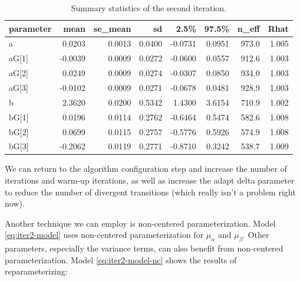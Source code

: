 \documentclass[11pt, oneside, openany]{scrbook}
\begin{document}
\begin{table}[!h]
\centering
\caption{\label{tab:ch042-Liquid-Strawberry-Eagle}Summary statistics of the second iteration.}
\centering
\begin{tabular}[t]{lrrrrrrr}
\toprule
parameter & mean & se\_mean & sd & 2.5\% & 97.5\% & n\_eff & Rhat\\
\midrule
a & 0.0203 & 0.0013 & 0.0400 & -0.0731 & 0.0951 & 973.0 & 1.005\\
aG[1] & -0.0039 & 0.0009 & 0.0272 & -0.0600 & 0.0557 & 912.6 & 1.003\\
aG[2] & 0.0249 & 0.0009 & 0.0274 & -0.0307 & 0.0850 & 934.0 & 1.003\\
aG[3] & -0.0102 & 0.0009 & 0.0271 & -0.0678 & 0.0481 & 928.9 & 1.003\\
b & 2.3620 & 0.0200 & 0.5342 & 1.4300 & 3.6154 & 710.9 & 1.002\\
\addlinespace
bG[1] & 0.0196 & 0.0114 & 0.2762 & -0.6464 & 0.5474 & 582.6 & 1.008\\
bG[2] & 0.0699 & 0.0115 & 0.2757 & -0.5776 & 0.5926 & 574.9 & 1.008\\
bG[3] & -0.2062 & 0.0119 & 0.2771 & -0.8710 & 0.3242 & 538.7 & 1.009\\
\bottomrule
\end{tabular}
\end{table}

We can return to the algorithm configuration step and increase the number of iterations and warm-up iterations, as well as increase the adapt delta parameter to reduce the number of divergent transitions (which really isn't a problem right now).

Another technique we can employ is non-centered parameterization. Model \eqref{eq:iter2-model} uses non-centered parameterization for \(\mu_\alpha\) and \(\mu_\beta\). Other parameters, especially the variance terms, can also benefit from non-centered parameterization. Model \eqref{eq:iter2-model-nc} shows the results of reparameterizing:

\end{document}
